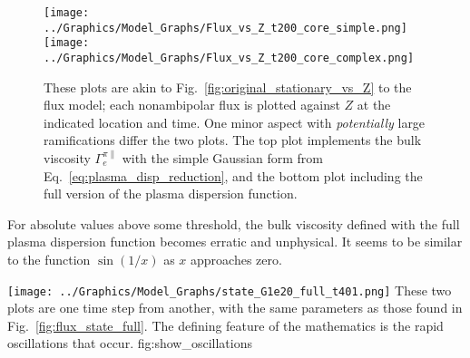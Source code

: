 \begin{figure}[htb] %
	\centering
	\texttt{[image: ../Graphics/Model\_Graphs/Flux\_vs\_Z\_t200\_core\_simple.png]}
	\texttt{[image: ../Graphics/Model\_Graphs/Flux\_vs\_Z\_t200\_core\_complex.png]}
	\caption{These plots are akin to Fig.~\ref{fig:original_stationary_vs_Z} to the flux model; each nonambipolar flux is plotted against $Z$ at the indicated location and time.
	One minor aspect with \emph{potentially} large ramifications differ the two plots.
The top plot implements the bulk viscosity $\Gamma_e^{\pi\parallel}$ with the simple Gaussian form from Eq.~\ref{eq:plasma_disp_reduction}, and the bottom plot including the full version of the plasma dispersion function.}
\end{figure}
For absolute values above some threshold, the bulk viscosity defined with the full plasma dispersion function becomes erratic and unphysical.
It seems to be similar to the function $\sin(1/x)$ as $x$ approaches zero.

	{\texttt{[image: ../Graphics/Model\_Graphs/state\_G1e20\_full\_t401.png]}}
	{These two plots are one time step from another, with the same parameters as those found in Fig.~\ref{fig:flux_state_full}.
	The defining feature of the mathematics is the rapid oscillations that occur.}
	{fig:show_oscillations}

